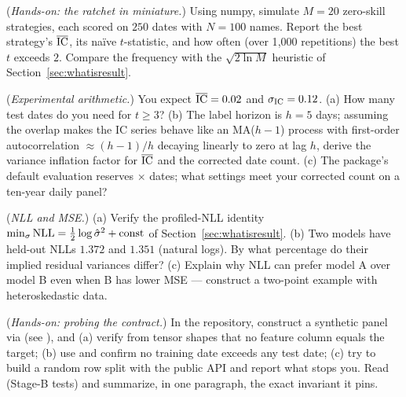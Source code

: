 \begin{exercise}\label{ex:1-bestofN}
(\emph{Hands-on: the ratchet in miniature.}) Using numpy, simulate $M = 20$
zero-skill strategies, each scored on $250$ dates with $N = 100$ names.
Report the best strategy's $\overline{\mathrm{IC}}$, its na\"ive $t$-statistic, and how often
(over 1{,}000 repetitions) the best $t$ exceeds $2$. Compare the frequency
with the $\sqrt{2\ln M}$ heuristic of Section~\ref{sec:whatisresult}.
\end{exercise}

\begin{exercise}\label{ex:1-tstat}
(\emph{Experimental arithmetic.}) You expect $\overline{\mathrm{IC}} = 0.02$ and
$\sigma_{\mathrm{IC}} = 0.12$. (a) How many test dates do you need for $t \geq 3$?
(b) The label horizon is $h = 5$ days; assuming the overlap makes the IC
series behave like an MA($h{-}1$) process with first-order autocorrelation
$\approx (h-1)/h$ decaying linearly to zero at lag $h$, derive the variance
inflation factor for $\overline{\mathrm{IC}}$ and the corrected date count. (c) The package's
default evaluation reserves  $\times$
 dates; what settings meet your corrected count
on a ten-year daily panel?
\end{exercise}

\begin{exercise}\label{ex:1-nll}
(\emph{NLL and MSE.}) (a) Verify the profiled-NLL identity
$\min_\sigma \mathrm{NLL} = \frac12 \log \hat\sigma^2 + \text{const}$ of
Section~\ref{sec:whatisresult}. (b) Two models have held-out NLLs $1.372$
and $1.351$ (natural logs). By what percentage do their implied residual
variances differ? (c) Explain why NLL can prefer model A over model B even
when B has lower MSE --- construct a two-point example with heteroskedastic
data.
\end{exercise}

\begin{exercise}\label{ex:1-panel}
(\emph{Hands-on: probing the contract.}) In the repository, construct a
synthetic panel via  (see
), and (a) verify from tensor shapes that no
feature column equals the target; (b) use  and confirm
no training date exceeds any test date; (c) try to build a random row split
with the public  API and report what stops you. Read
 (Stage-B tests) and summarize, in one
paragraph, the exact invariant it pins.
\end{exercise}
